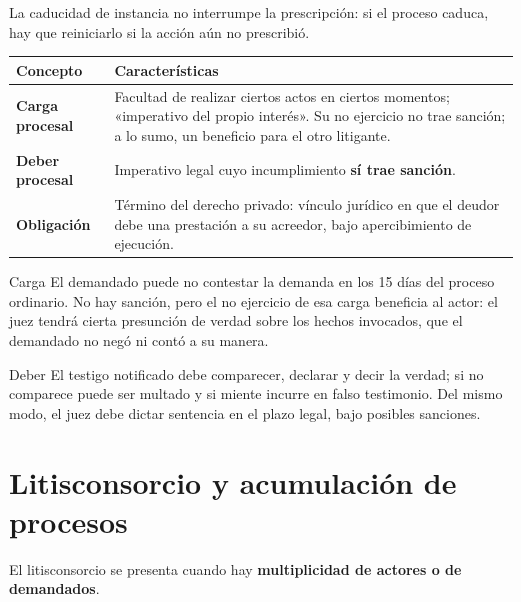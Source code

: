\documentclass[12pt,oneside]{book}
\renewcommand{\arraystretch}{1.15}
\begin{document}
\begin{note}
La caducidad de instancia no interrumpe la prescripción: si el proceso caduca, hay que reiniciarlo si la acción aún no prescribió.
\end{note}

\begin{table}[H]
\centering
\renewcommand{\arraystretch}{1.25}
\begin{tabularx}{\textwidth}{>{\bfseries\RaggedRight\arraybackslash}p{}>{\RaggedRight\arraybackslash}X}
\toprule
Concepto & Características \\
\midrule
Carga procesal & Facultad de realizar ciertos actos en ciertos momentos; «imperativo del propio interés». Su no ejercicio no trae sanción; a lo sumo, un beneficio para el otro litigante. \\
\addlinespace
Deber procesal & Imperativo legal cuyo incumplimiento \textbf{sí trae sanción}. \\
\addlinespace
Obligación & Término del derecho privado: vínculo jurídico en que el deudor debe una prestación a su acreedor, bajo apercibimiento de ejecución. \\
\bottomrule
\end{tabularx}
\end{table}

\begin{example}{Carga}
El demandado puede no contestar la demanda en los 15 días del proceso ordinario. No hay sanción, pero el no ejercicio de esa carga beneficia al actor: el juez tendrá cierta presunción de verdad sobre los hechos invocados, que el demandado no negó ni contó a su manera.
\end{example}

\begin{example}{Deber}
El testigo notificado debe comparecer, declarar y decir la verdad; si no comparece puede ser multado y si miente incurre en falso testimonio. Del mismo modo, el juez debe dictar sentencia en el plazo legal, bajo posibles sanciones.
\end{example}

\section{Litisconsorcio y acumulación de procesos}

El litisconsorcio se presenta cuando hay \textbf{multiplicidad de actores o de demandados}.
\end{document}

